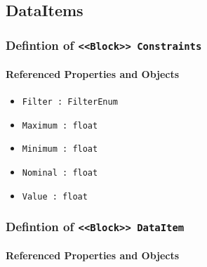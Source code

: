 \subsection{DataItems} \label{model:DataItems}
\subsubsection{Defintion of \texttt{<<Block>> Constraints}}
  \label{type:Constraints}

\FloatBarrier



\FloatBarrier
\paragraph{Referenced Properties and Objects}

\begin{itemize}
\item \texttt{Filter : FilterEnum}

\item \texttt{Maximum : float}

\item \texttt{Minimum : float}

\item \texttt{Nominal : float}

\item \texttt{Value : float}

\end{itemize}
\FloatBarrier
\subsubsection{Defintion of \texttt{<<Block>> DataItem}}
  \label{type:DataItem}

\FloatBarrier



\FloatBarrier
\paragraph{Referenced Properties and Objects}

